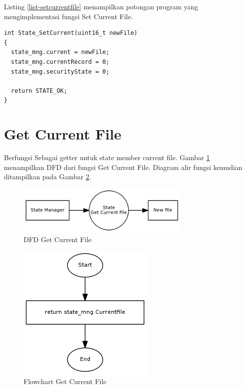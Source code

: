 Listing \ref{list-setcurrentfile} menampilkan potongan program yang mengimplementasi fungsi Set Current File.

\begin{lstlisting}[caption={Listing Program Fungsi Set Current File}, label={list-setcurrentfile}]
int State_SetCurrent(uint16_t newFile)
{
  state_mng.current = newFile;
  state_mng.currentRecord = 0;
  state_mng.securityState = 0;

  return STATE_OK;
}
\end{lstlisting}


\section{Get Current File}
\label{sec_getcurrentfile}

Berfungsi Sebagai getter untuk state member current file. Gambar \ref{fig-dfd-getcurrentfile} menampilkan DFD dari fungsi Get Current File. Diagram alir fungsi kemudian ditampilkan pada Gambar \ref{fig-flow-getcurrentfile}. 

\begin{figure}[h]
\centering
\includegraphics[width=0.75\textwidth]{image/state/dfd_getcurrentfile.png}
\caption{DFD Get Current File}
\label{fig-dfd-getcurrentfile}
\end{figure}

\begin{figure}[h]
\centering
\includegraphics[height=0.25\textheight]{image/state/flow_getcurrentfile.png}
\caption{Flowchart Get Current File}
\label{fig-flow-getcurrentfile}
\end{figure}

